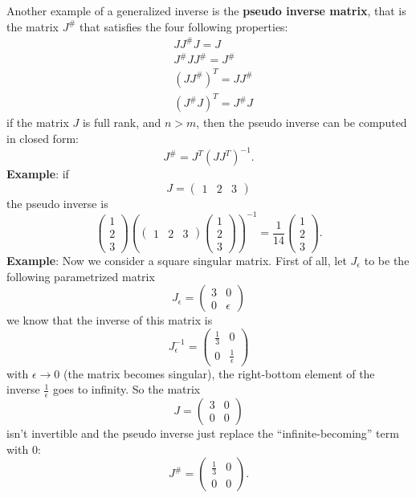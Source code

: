\documentclass[10pt, a4paper]{report}
\begin{document}
Another example of a generalized inverse is the \textbf{pseudo inverse matrix}, that is the matrix $J^\#$ that satisfies the four following properties:\begin{align}
    &JJ^\#J=J\\ 
    &J^\#JJ^\#=J^\#\\ 
    &(JJ^\#)^T=JJ^\#\\ 
    &(J^\#J)^T=J^\#J
\end{align}
if the matrix $J$ is full rank, and $n>m$, then the pseudo inverse can be computed in closed form:\begin{equation}
    J^\#=J^T(JJ^T)^{-1}.
\end{equation}
\textbf{Example}: if $$J=\begin{pmatrix}
    1&2&3
\end{pmatrix} $$
the pseudo inverse is 
$$ 
\begin{pmatrix}
    1\\2\\3
\end{pmatrix}\left(
\begin{pmatrix}
    1&2&3
\end{pmatrix}\begin{pmatrix}
    1\\2\\3
\end{pmatrix}
\right)^{-1}=\frac{1}{14}\begin{pmatrix}
    1\\2\\3
\end{pmatrix}.
$$
\textbf{Example}: Now we consider a square singular matrix. First of all, let $J_\epsilon$ to be the following parametrized matrix
$$J_\epsilon=\begin{pmatrix}
    3&0\\ 0&\epsilon
\end{pmatrix}
$$
we know that the inverse of this matrix is$$
    J_\epsilon^{-1}=\begin{pmatrix}
        \frac{1}{3}&0\\0&\frac{1}{\epsilon}
    \end{pmatrix}
$$
with $\epsilon\rightarrow 0$ (the matrix becomes singular), the right-bottom element of the inverse $\frac{1}{\epsilon}$ goes to infinity. So the matrix 
$$J=\begin{pmatrix}
    3&0\\ 0&0
\end{pmatrix}
$$
isn't invertible and the pseudo inverse just replace the ``infinite-becoming'' term with 0:$$
J^\#=\begin{pmatrix}
        \frac{1}{3}&0\\0&0
    \end{pmatrix}.
$$
\end{document}
